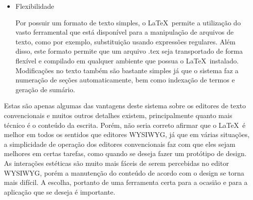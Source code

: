\begin{itemize}
\item Flexibilidade

Por possuir um formato de texto simples, o \LaTeX\ permite a utilização do vasto ferramental que está disponível para a manipulação de arquivos de texto, como por exemplo, substituição usando expressões regulares. Além disso, este formato permite que um arquivo .tex seja transportado de forma flexível e compilado em qualquer ambiente que possua o \LaTeX\ instalado. Modificações no texto também são bastante simples já que o sistema faz a numeração de seções automaticamente, bem como indexação de termos e geração de sumário.

\end{itemize}

Estas são apenas algumas das vantagens deste sistema sobre os editores de texto convencionais e muitos outros detalhes existem, principalmente quanto mais técnico é o conteúdo da escrita. Porém, não seria correto afirmar que o \LaTeX\ é melhor em todos os sentidos que editores WYSIWYG, já que em várias situações, a simplicidade de operação dos editores convencionais faz com que eles sejam melhores em certas tarefas, como quando se deseja fazer um protótipo de design. As interações estéticas são muito mais fáceis de serem percebidas no editor WYSIWYG, porém a manutenção do conteúdo de acordo com o design se torna mais difícil. A escolha, portanto de uma ferramenta certa para a ocasião e para a aplicação que se deseja é importante.


